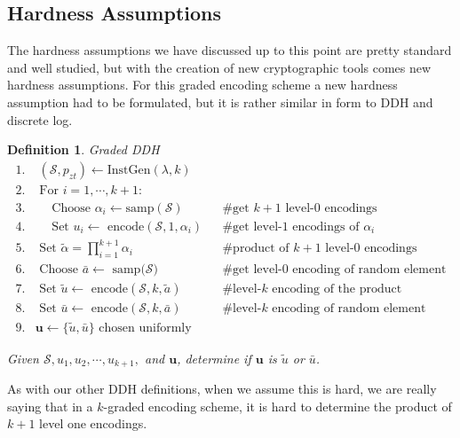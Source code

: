 \documentclass[12pt,twoside]{reedthesis}
\newtheorem{definition}{Definition}
\begin{document}
    
    
    
    \subsection{Hardness Assumptions}
    
    The hardness assumptions we have discussed up to this point are pretty standard and well studied, but with the creation of new cryptographic tools comes new hardness assumptions. For this graded encoding scheme a new hardness assumption had to be formulated, but it is rather similar in form to DDH and discrete log.
        
    \begin{definition}{Graded DDH}
    \begin{align*}
    1. &\; (\mathcal{S},p_{zt}) \leftarrow \text{InstGen}(\lambda,k) && \\
    2. & \text{ For } i = 1,\cdots,k+1: && \\
    3. &\quad \text{ Choose } \alpha_i \leftarrow \text{samp}(\mathcal{S}) && \text{\# get $k+1$ level-0 encodings} \\
    4. &\quad \text{ Set $u_i \leftarrow$ encode$(\mathcal{S},1,\alpha_i)$} &&\text{\# get level-1 encodings of $\alpha_i$} \\
    5. & \text{ Set $\tilde{\alpha} = \prod_{i=1}^{k+1}$}\alpha_i &&\text{\# product of $k+1$ level-0 encodings} \\
    6. & \text{ Choose $\bar{a} \leftarrow$ samp($\mathcal{S}$)} &&\text{\# get level-0 encoding of random element} \\
    7. & \text{ Set $\tilde{u} \leftarrow$ encode$(\mathcal{S},k,\tilde{a})$} &&\text{\# level-$k$ encoding of the product} \\
    8. & \text{ Set $\bar{u}\leftarrow$ encode$(\mathcal{S},k,\bar{a})$} &&\text{\# level-$k$ encoding of random element} \\
    9. & \boldsymbol{u} \leftarrow \{\tilde{u},\bar{u} \} \text{ chosen uniformly} &&
    \end{align*}
    \par Given $\mathcal{S},u_1,u_2,\cdots,u_{k+1},$ and $\boldsymbol{u}$, determine if $\boldsymbol{u}$ is $\tilde{u}$ or $\bar{u}$.
    \end{definition}
    
    As with our other DDH definitions, when we assume this is hard, we are really saying that in a $k$-graded encoding scheme, it is hard to determine the product of $k+1$ level one encodings. 
    
\end{document}

